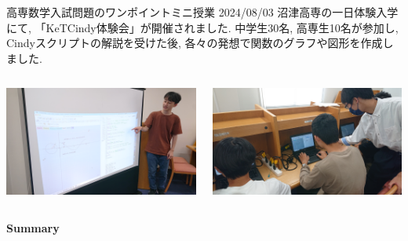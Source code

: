 \documentclass[dvipdfmx, unicode]{beamer}
\begin{document}
\begin{frame}[t]{高専数学入試問題のワンポイントミニ授業 2024/08/03}
  沼津高専の一日体験入学にて, 「KeTCindy体験会」が開催されました.
  中学生30名, 高専生10名が参加し, Cindyスクリプトの解説を受けた後,
  各々の発想で関数のグラフや図形を作成しました.
  \begin{columns}[T]
    \begin{column}{0.5\linewidth}
      \includegraphics[width=\linewidth]{img/ActiveReport/20240803onepoint3.jpg}
    \end{column}
    \begin{column}{0.5\linewidth}
      \includegraphics[width=\linewidth]{img/ActiveReport/20240803onepoint4.jpg}
    \end{column}
  \end{columns}
\end{frame}

\begin{frame}[t]{\bfseries Summary}
  \tableofcontents
\end{frame}

\end{document}

